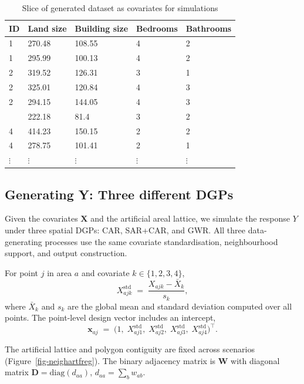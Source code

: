 \documentclass[a4paper,reqno]{amsart}
\begin{document}
\begin{longtable}[t]{lllll}

\caption{\label{tbl-covrstr}Slice of generated dataset as covariates for
simulations}

\tabularnewline

\toprule
ID & Land size & Building size & Bedrooms & Bathrooms\\
\midrule
1 & 270.48 & 108.55 & 4 & 2\\
1 & 295.99 & 100.13 & 4 & 2\\
2 & 319.52 & 126.31 & 3 & 1\\
2 & 325.01 & 120.84 & 4 & 3\\
2 & 294.15 & 144.05 & 4 & 3\\
\addlinespace
3 & 222.18 & 81.4 & 3 & 2\\
4 & 414.23 & 150.15 & 2 & 2\\
4 & 278.75 & 101.41 & 2 & 1\\
$\vdots$ & $\vdots$ & $\vdots$ & $\vdots$ & $\vdots$\\
\bottomrule

\end{longtable}

\endgroup{}

\subsection{Generating Y: Three different DGPs}\label{generating-y-three-different-s}

Given the covariates \(\mathbf X\) and the artificial areal lattice, we
simulate the response \(Y\) under three spatial DGPs: CAR,
SAR+CAR, and GWR. All three data-generating processes
use the same covariate standardisation, neighbourhood support, and
output construction.

For point \(j\) in area \(a\) and covariate \(k\in\{1,2,3,4\}\), \[
X_{ajk}^{\text{std}} \;=\; \frac{X_{ajk} - \bar X_k}{s_k},
\] where \(\bar X_k\) and \(s_k\) are the global mean and standard
deviation computed over all points. The point-level design vector
includes an intercept, \[
\mathbf x_{aj} \;=\; \big(1,\;X_{aj1}^{\text{std}},\;X_{aj2}^{\text{std}},\;X_{aj3}^{\text{std}},\;X_{aj4}^{\text{std}}\big)^\top .
\]

The artificial lattice and polygon contiguity are fixed across scenarios
(Figure~\ref{fig-neighartfreg}). The binary adjacency matrix is
\(\mathbf W\) with diagonal matrix \(\mathbf D=\mathrm{diag}(d_{aa})\),
\(d_{aa}=\sum_b w_{ab}\).
\end{document}
